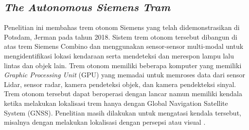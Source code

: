 \subsection{\textit{The Autonomous Siemens Tram}}
Penelitian ini membahas trem otonom Siemens yang telah didemonstrasikan di
Potsdam, Jerman pada tahun 2018. Sistem trem otonom tersebut dibangun di atas
trem Siemens Combino dan menggunakan sensor-sensor multi-modal untuk
mengidentifikasi lokasi kendaraan serta mendeteksi dan merespon lampu lalu
lintas dan objek lain. Trem otonom memiliki beberapa komputer yang memiliki
\textit{Graphic Processing Unit} (GPU) yang memadai untuk memroses data dari
sensor Lidar, sensor radar, kamera pendeteksi objek, dan kamera pendekteksi
sinyal. Trem otonom tersebut dapat beroperasi dengan lancar namun memiliki
kendala ketika melakukan lokalisasi trem hanya dengan Global Navigation
Satellite System (GNSS). Penelitian masih dilakukan untuk mengatasi kendala
tersebut, misalnya dengan melakukan lokalisasi dengan persepsi atau visual
\parencite{at-palmer}.

